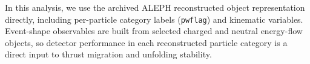 In this analysis, we use the archived ALEPH reconstructed object representation directly, including per-particle category labels (\texttt{pwflag}) and kinematic variables. Event-shape observables are built from selected charged and neutral energy-flow objects, so detector performance in each reconstructed particle category is a direct input to thrust migration and unfolding stability.
